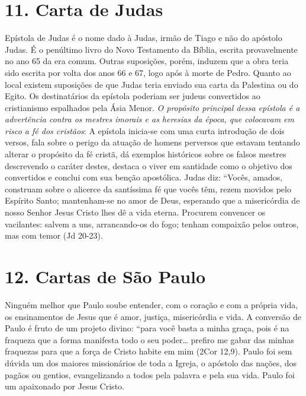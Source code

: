 \documentclass[
]{book}
\begin{document}
\hypertarget{carta-de-judas}{%
\section*{11. Carta de Judas}\label{carta-de-judas}}

Epístola de Judas é o nome dado à Judas, irmão de Tiago e não do apóstolo Judas. É o penúltimo livro do Novo Testamento da Bíblia, escrita provavelmente no ano 65 da era comum. Outras suposições, porém, induzem que a obra teria sido escrita por volta dos anos 66 e 67, logo após à morte de Pedro. Quanto ao local existem suposições de que Judas teria enviado sua carta da Palestina ou do Egito. Os destinatários da epístola poderiam ser judeus convertidos ao cristianismo espalhados pela Ásia Menor. \emph{O propósito principal dessa epístola é a advertência contra os mestres imorais e as heresias da época, que colocavam em risco a fé dos cristãos}: A epístola inicia-se com uma curta introdução de dois versos, fala sobre o perigo da atuação de homens perversos que estavam tentando alterar o propósito da fé cristã, dá exemplos históricos sobre os falsos mestres descrevendo o caráter destes, destaca o viver em santidade como o objetivo dos convertidos e conclui com sua benção apostólica. Judas diz: ``Vocês, amados, construam sobre o alicerce da santíssima fé que vocês têm, rezem movidos pelo Espírito Santo; mantenham-se no amor de Deus, esperando que a misericórdia de nosso Senhor Jesus Cristo lhes dê a vida eterna. Procurem convencer os vacilantes: salvem a uns, arrancando-os do fogo; tenham compaixão pelos outros, mas com temor (Jd 20-23).

\hypertarget{cartas-de-suxe3o-paulo}{%
\section*{12. Cartas de São Paulo}\label{cartas-de-suxe3o-paulo}}

Ninguém melhor que Paulo soube entender, com o coração e com a própria vida, os ensinamentos de Jesus que é amor, justiça, misericórdia e vida. A conversão de Paulo é fruto de um projeto divino: ``para você basta a minha graça, pois é na fraqueza que a forma manifesta todo o seu poder\ldots{} prefiro me gabar das minhas fraquezas para que a força de Cristo habite em mim (2Cor 12,9). Paulo foi sem dúvida um dos maiores missionários de toda a Igreja, o apóstolo das nações, dos pagãos ou gentios, evangelizando a todos pela palavra e pela sua vida. Paulo foi um apaixonado por Jesus Cristo.
\end{document}

